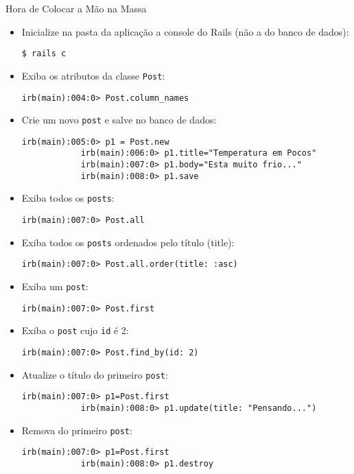 \begin{frame}{Hora de Colocar a Mão na Massa}
	\begin{itemize}
		\item Inicialize \alert{na pasta da aplicação} a console do Rails (não a do banco de dados):
		\begin{lstlisting}[style=BashInputBasicStyle]
			$ rails c
		\end{lstlisting}
		
		\item Exiba os atributos da classe \verb|Post|:
		\begin{lstlisting}[style=BashInputBasicStyle]
			irb(main):004:0> Post.column_names
		\end{lstlisting}
		
		\item Crie um novo \verb|post| e salve no banco de dados:
		\begin{lstlisting}[style=BashInputBasicStyle]
			irb(main):005:0> p1 = Post.new
			irb(main):006:0> p1.title="Temperatura em Pocos"
			irb(main):007:0> p1.body="Esta muito frio..."
			irb(main):008:0> p1.save
		\end{lstlisting}
		
		\item Exiba todos os \verb|posts|:
		\begin{lstlisting}[style=BashInputBasicStyle]
			irb(main):007:0> Post.all
		\end{lstlisting}
		
		\item Exiba todos os \verb|posts| ordenados pelo título (title):
		\begin{lstlisting}[style=BashInputBasicStyle]
			irb(main):007:0> Post.all.order(title: :asc)
		\end{lstlisting}
		
		\item Exiba um \verb|post|:
		\begin{lstlisting}[style=BashInputBasicStyle]
			irb(main):007:0> Post.first
		\end{lstlisting}
		
		\item Exiba o \verb|post| cujo \verb|id| é 2:
		\begin{lstlisting}[style=BashInputBasicStyle]
			irb(main):007:0> Post.find_by(id: 2)
		\end{lstlisting}
		
		\item Atualize o título do primeiro \verb|post|:
		\begin{lstlisting}[style=BashInputBasicStyle]
			irb(main):007:0> p1=Post.first
			irb(main):008:0> p1.update(title: "Pensando...")
		\end{lstlisting}
		
		\item Remova do primeiro \verb|post|:
		\begin{lstlisting}[style=BashInputBasicStyle]
			irb(main):007:0> p1=Post.first
			irb(main):008:0> p1.destroy
		\end{lstlisting}
		
	\end{itemize}
\end{frame}